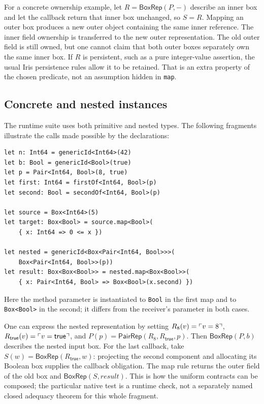 For a concrete ownership example, let \(R=\mathsf{BoxRep}(P,-)\)
describe an inner box and let the callback return that inner box unchanged,
so \(S=R\). Mapping an outer box produces a new outer object containing
the same inner reference. The inner field ownership is transferred to the
new outer representation. The old outer field is still owned, but one
cannot claim that both outer boxes separately own the same inner box.
If \(R\) is persistent, such as a pure integer-value assertion, the usual
Iris persistence rules allow it to be retained. That is an extra property
of the chosen predicate, not an assumption hidden in \texttt{map}.

\subsection{Concrete and nested instances}

The runtime suite uses both primitive and nested types. The following
fragments illustrate the calls made possible by the declarations:
\begin{lstlisting}
let n: Int64 = genericId<Int64>(42)
let b: Bool = genericId<Bool>(true)
let p = Pair<Int64, Bool>(8, true)
let first: Int64 = firstOf<Int64, Bool>(p)
let second: Bool = secondOf<Int64, Bool>(p)

let source = Box<Int64>(5)
let target: Box<Bool> = source.map<Bool>(
    { x: Int64 => 0 <= x })

let nested = genericId<Box<Pair<Int64, Bool>>>(
    Box<Pair<Int64, Bool>>(p))
let result: Box<Box<Bool>> = nested.map<Box<Bool>>(
    { x: Pair<Int64, Bool> => Box<Bool>(x.second) })
\end{lstlisting}
Here the method parameter is instantiated to \texttt{Bool} in the first
map and to \texttt{Box<Bool>} in the second; it differs from the receiver's
parameter in both cases.

One can express the nested representation by setting
\(R_8(v)=\ulcorner v=8 \urcorner\), \(R_{\mathsf{true}}(v)=\ulcorner v=\mathsf{true} \urcorner\),
and \(P(p)=\mathsf{PairRep}(R_8,R_{\mathsf{true}},p)\).
Then \(\mathsf{BoxRep}(P,b)\) describes the nested input box.
For the last callback, take
\(S(w)=\mathsf{BoxRep}(R_{\mathsf{true}},w)\): projecting the second
component and allocating its Boolean box supplies the callback obligation.
The map rule returns the outer field of the old box and
\(\mathsf{BoxRep}(S,\mathit{result})\). This is how the uniform
contracts can be composed; the particular native test is a runtime check,
not a separately named closed adequacy theorem for this whole fragment.

